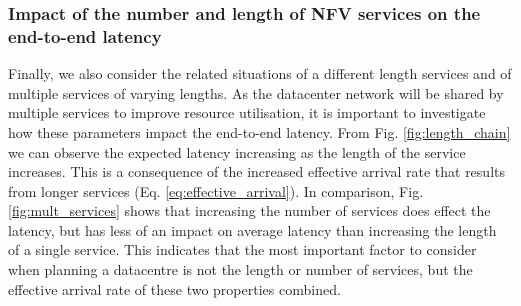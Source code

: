 \subsubsection{Impact of the number and length of NFV services on the end-to-end latency}
Finally, we also consider the related situations of a different length services and of multiple services of varying lengths. As the datacenter network will be shared by multiple services to improve resource utilisation, it is important to investigate how these parameters impact the end-to-end latency. From Fig. \ref{fig:length_chain} we can observe the expected latency increasing as the length of the service increases. This is a consequence of the increased effective arrival rate that results from longer services (Eq. \ref{eq:effective_arrival}). In comparison, Fig. \ref{fig:mult_services} shows that increasing the number of services does effect the latency, but has less of an impact on average latency than increasing the length of a single service. This indicates that the most important factor to consider when planning a datacentre is not the length or number of services, but the effective arrival rate of these two properties combined.